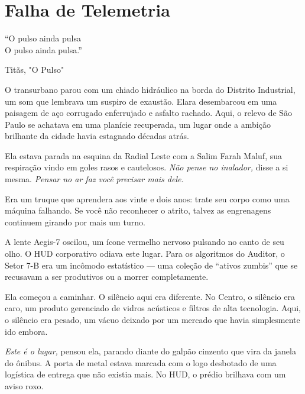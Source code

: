 
\chapter{Falha de Telemetria}
\epigraph{``O pulso ainda pulsa \\ O pulso ainda pulsa.''}{Titãs, "O Pulso"}

O transurbano parou com um chiado hidráulico na borda do Distrito Industrial, um som que lembrava um suspiro de exaustão. Elara desembarcou em uma paisagem de aço corrugado enferrujado e asfalto rachado. Aqui, o relevo de São Paulo se achatava em uma planície recuperada, um lugar onde a ambição brilhante da cidade havia estagnado décadas atrás.

Ela estava parada na esquina da Radial Leste com a Salim Farah Maluf, sua respiração vindo em goles rasos e cautelosos. \textit{Não pense no inalador,} disse a si mesma. \textit{Pensar no ar faz você precisar mais dele.} 

Era um truque que aprendera aos vinte e dois anos: trate seu corpo como uma máquina falhando. Se você não reconhecer o atrito, talvez as engrenagens continuem girando por mais um turno.


A lente Aegis-7 oscilou, um ícone vermelho nervoso pulsando no canto de seu olho. O HUD corporativo odiava este lugar. Para os algoritmos do Auditor, o Setor 7-B era um incômodo estatístico --- uma coleção de ``ativos zumbis'' que se recusavam a ser produtivos ou a morrer completamente.

Ela começou a caminhar. O silêncio aqui era diferente. No Centro, o silêncio era caro, um produto gerenciado de vidros acústicos e filtros de alta tecnologia. Aqui, o silêncio era pesado, um vácuo deixado por um mercado que havia simplesmente ido embora.

\textit{Este é o lugar,} pensou ela, parando diante do galpão cinzento que vira da janela do ônibus. A porta de metal estava marcada com o logo desbotado de uma logística de entrega que não existia mais. No HUD, o prédio brilhava com um aviso roxo.


